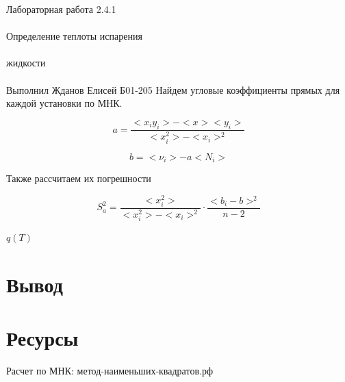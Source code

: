 \documentclass{astroedu-lab}
\begin{document}
\begin{problem}{\huge Лабораторная работа 2.4.1\\\\Определение теплоты испарения\\\\жидкости\\\\Выполнил Жданов Елисей Б01-205}
Найдем угловые коэффициенты прямых для каждой установки по МНК.

\[
	a = \frac{<x_i y_i> - < x > < y_i >}{< x_i^2> - < x_i >^2}
\]

\[
	b = < \nu_i > - a < N_i >
\]

Также рассчитаем их погрешности

\begin{equation}
	S_a^2 = \frac{< x_i^2>}{< x_i^2 > - < x_i >^2} \cdot \frac{<  b_i - b > ^2}{n - 2}
\end{equation}


\begin{center}
	\Large $q(T)$
\end{center}


\section{Вывод}


\section{Ресурсы}

Расчет по МНК: метод-наименьших-квадратов.рф


\end{problem}
\end{document}
